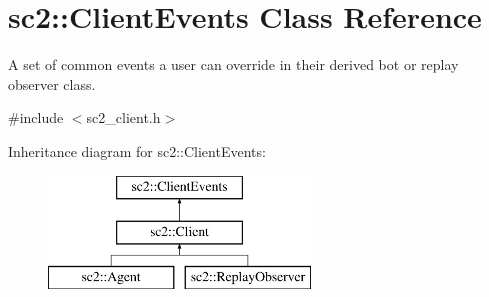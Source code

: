 \hypertarget{classsc2_1_1_client_events}{}\section{sc2\+:\+:Client\+Events Class Reference}
\label{classsc2_1_1_client_events}


A set of common events a user can override in their derived bot or replay observer class.  




{\ttfamily \#include $<$sc2\+\_\+client.\+h$>$}

Inheritance diagram for sc2\+:\+:Client\+Events\+:\begin{figure}[H]
\begin{center}
\leavevmode
\includegraphics[height=3.000000cm]{classsc2_1_1_client_events}
\end{center}
\end{figure}
